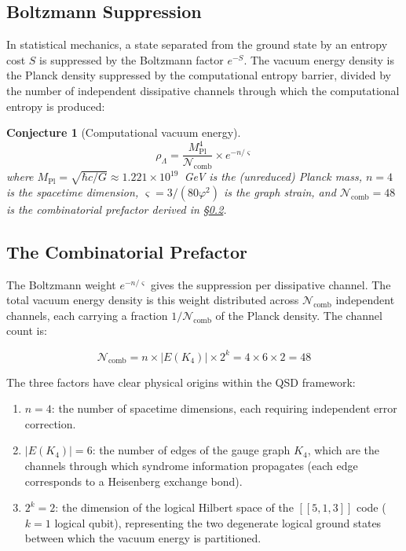 \documentclass[11pt,a4paper]{article}
\newtheorem{conjecture}[theorem]{Conjecture}
\theoremstyle{definition}
\newcommand{\gs}{\varsigma}                %
\newcommand{\Mpl}{M_{\text{Pl}}}
\newcommand{\rhoL}{\rho_{\Lambda}}
\newcommand{\Ncomb}{\mathcal{N}_{\text{comb}}}
\begin{document}
\subsection{Boltzmann Suppression}

In statistical mechanics, a state separated from the ground state by an entropy cost $S$ is suppressed by the Boltzmann factor $e^{-S}$. The vacuum energy density is the Planck density suppressed by the computational entropy barrier, divided by the number of independent dissipative channels through which the computational entropy is produced:

\begin{conjecture}[Computational vacuum energy]\label{conj:cc}
\begin{equation}\label{eq:rhoL}
    \boxed{\rhoL = \frac{\Mpl^4}{\Ncomb} \times e^{-n/\gs}}
\end{equation}
where $\Mpl = \sqrt{\hbar c / G} \approx 1.221 \times 10^{19}$~GeV is the (unreduced) Planck mass, $n = 4$ is the spacetime dimension, $\gs = 3/(80\varphi^2)$ is the graph strain, and $\Ncomb = 48$ is the combinatorial prefactor derived in \S\ref{sec:prefactor}.
\end{conjecture}

\subsection{The Combinatorial Prefactor}\label{sec:prefactor}

The Boltzmann weight $e^{-n/\gs}$ gives the suppression per dissipative channel. The total vacuum energy density is this weight distributed across $\Ncomb$ independent channels, each carrying a fraction $1/\Ncomb$ of the Planck density. The channel count is:

\begin{equation}\label{eq:Ncomb}
    \Ncomb = n \times |E(K_4)| \times 2^k = 4 \times 6 \times 2 = 48
\end{equation}

The three factors have clear physical origins within the QSD framework:

\begin{enumerate}[nosep]
    \item $n = 4$: the number of spacetime dimensions, each requiring independent error correction.
    \item $|E(K_4)| = 6$: the number of edges of the gauge graph $K_4$, which are the channels through which syndrome information propagates (each edge corresponds to a Heisenberg exchange bond).
    \item $2^k = 2$: the dimension of the logical Hilbert space of the $[[5,1,3]]$ code ($k = 1$ logical qubit), representing the two degenerate logical ground states between which the vacuum energy is partitioned.
\end{enumerate}
\end{document}
